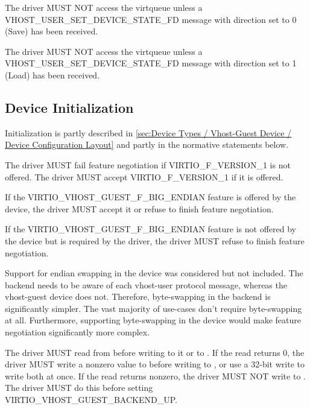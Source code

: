 The driver MUST NOT access the  virtqueue
unless a VHOST_USER_SET_DEVICE_STATE_FD message with direction
set to 0 (Save) has been received.

The driver MUST NOT access the  virtqueue
unless a VHOST_USER_SET_DEVICE_STATE_FD message with direction
set to 1 (Load) has been received.

\subsection{Device Initialization}\label{sec:Device Types / Vhost-Guest Device / Device Initialization}

Initialization is partly described in
\ref{sec:Device Types / Vhost-Guest Device / Device Configuration Layout}
and partly in the normative statements below.


The driver MUST fail feature negotiation if VIRTIO_F_VERSION_1 is
not offered. The driver MUST accept VIRTIO_F_VERSION_1 if it is
offered.

If the VIRTIO_VHOST_GUEST_F_BIG_ENDIAN feature is offered by the
device, the driver MUST accept it or refuse to finish feature
negotiation.

If the VIRTIO_VHOST_GUEST_F_BIG_ENDIAN feature is not offered by
the device but is required by the driver, the driver MUST refuse
to finish feature negotiation.

\begin{note}
Support for endian swapping in the device was considered but not
included. The backend needs to be aware of each vhost-user
protocol message, whereas the vhost-guest device does not.
Therefore, byte-swapping in the backend is significantly simpler.
The vast majority of use-cases don't require byte-swapping at
all. Furthermore, supporting byte-swapping in the device would
make feature negotiation significantly more complex.
\end{note}

The driver MUST read from  before
writing to it or to . If the read returns 0, the
driver MUST write a nonzero value to
 before writing to ,
or use a 32-bit write to write both at once. If the read returns
nonzero, the driver MUST NOT write to
. The driver MUST do this before
setting VIRTIO_VHOST_GUEST_BACKEND_UP.

